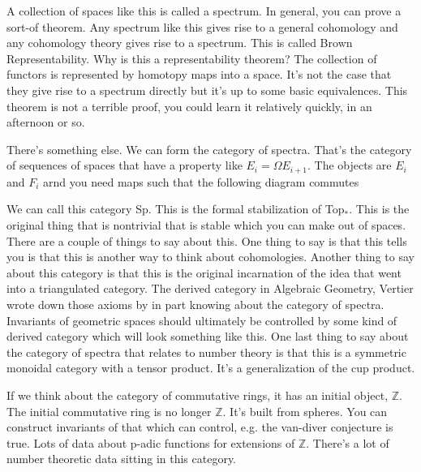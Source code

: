 \documentclass[12pt]{article}
\theoremstyle{definition}
\begin{document}
	A collection of spaces like this is called a spectrum. In general, you can prove a sort-of theorem. Any spectrum like this gives rise to a general cohomology and any cohomology theory gives rise to a spectrum. This is called Brown Representability. Why is this a representability theorem? The collection of functors is represented by homotopy maps into a space. It's not the case that they give rise to a spectrum directly but it's up to some basic equivalences. This theorem is not a terrible proof, you could learn it relatively quickly, in an afternoon or so. 
	
	There's something else. We can form the category of spectra. That's the category of sequences of spaces that have a property like $E_i=\Omega E_{i+1}$. The objects are $E_i$ and $F_i$ arnd you need maps such that the following diagram commutes
	\begin{center}
	\end{center}
	We can call this category \textsf{Sp}. This is the formal stabilization of \textsf{Top}$_\ast$. This is the original thing that is nontrivial that is stable which you can make out of spaces. There are a couple of things to say about this. One thing to say is that this tells you is that this is another way to think about cohomologies. Another thing to say about this category is that this is the original incarnation of the idea that went into a triangulated category. The derived category in Algebraic Geometry, Vertier wrote down those axioms by in part knowing about the category of spectra. Invariants of geometric spaces should ultimately be controlled by some kind of derived category which will look something like this. One last thing to say about the category of spectra that relates to number theory is that this is a symmetric monoidal category with a tensor product. It's a generalization of the cup product. 
	
	If we think about the category of commutative rings, it has an initial object, $\mathbb{Z}$. The initial commutative ring is no longer $\mathbb{Z}$. It's built from spheres. You can construct invariants of that which can control, e.g. the van-diver conjecture is true. Lots of data about p-adic functions for extensions of $\mathbb{Z}$. There's a lot of number theoretic data sitting in this category. 
	
\end{document}

